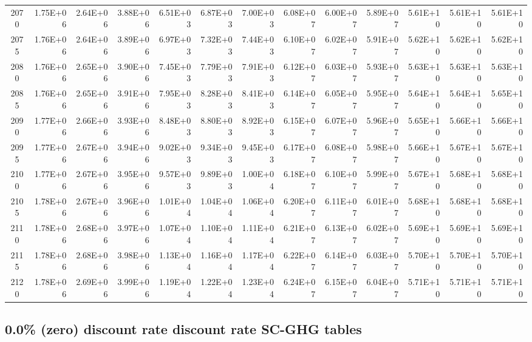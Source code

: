 \documentclass{article}
\begin{document}
\begin{table}
\begin{tabular}{crrr|rrr|rrr|rrr}
2070     & 1.75E+06   & 2.64E+06   & 3.88E+06   & 6.51E+03   & 6.87E+03   & 7.00E+03   & 6.08E+07   & 6.00E+07   & 5.89E+07   & 5.61E+10   & 5.61E+10   & 5.61E+10   \\
2075     & 1.76E+06   & 2.64E+06   & 3.89E+06   & 6.97E+03   & 7.32E+03   & 7.44E+03   & 6.10E+07   & 6.02E+07   & 5.91E+07   & 5.62E+10   & 5.62E+10   & 5.62E+10   \\
2080     & 1.76E+06   & 2.65E+06   & 3.90E+06   & 7.45E+03   & 7.79E+03   & 7.91E+03   & 6.12E+07   & 6.03E+07   & 5.93E+07   & 5.63E+10   & 5.63E+10   & 5.63E+10   \\
2085     & 1.76E+06   & 2.65E+06   & 3.91E+06   & 7.95E+03   & 8.28E+03   & 8.41E+03   & 6.14E+07   & 6.05E+07   & 5.95E+07   & 5.64E+10   & 5.64E+10   & 5.65E+10   \\
2090     & 1.77E+06   & 2.66E+06   & 3.93E+06   & 8.48E+03   & 8.80E+03   & 8.92E+03   & 6.15E+07   & 6.07E+07   & 5.96E+07   & 5.65E+10   & 5.66E+10   & 5.66E+10   \\
2095     & 1.77E+06   & 2.67E+06   & 3.94E+06   & 9.02E+03   & 9.34E+03   & 9.45E+03   & 6.17E+07   & 6.08E+07   & 5.98E+07   & 5.66E+10   & 5.67E+10   & 5.67E+10   \\
2100     & 1.77E+06   & 2.67E+06   & 3.95E+06   & 9.57E+03   & 9.89E+03   & 1.00E+04   & 6.18E+07   & 6.10E+07   & 5.99E+07   & 5.67E+10   & 5.68E+10   & 5.68E+10   \\
2105     & 1.78E+06   & 2.67E+06   & 3.96E+06   & 1.01E+04   & 1.04E+04   & 1.06E+04   & 6.20E+07   & 6.11E+07   & 6.01E+07   & 5.68E+10   & 5.68E+10   & 5.68E+10   \\
2110     & 1.78E+06   & 2.68E+06   & 3.97E+06   & 1.07E+04   & 1.10E+04   & 1.11E+04   & 6.21E+07   & 6.13E+07   & 6.02E+07   & 5.69E+10   & 5.69E+10   & 5.69E+10   \\
2115     & 1.78E+06   & 2.68E+06   & 3.98E+06   & 1.13E+04   & 1.16E+04   & 1.17E+04   & 6.22E+07   & 6.14E+07   & 6.03E+07   & 5.70E+10   & 5.70E+10   & 5.70E+10   \\
2120     & 1.78E+06   & 2.69E+06   & 3.99E+06   & 1.19E+04   & 1.22E+04   & 1.23E+04   & 6.24E+07   & 6.15E+07   & 6.04E+07   & 5.71E+10   & 5.71E+10   & 5.71E+10  

\end{tabular}   \end{table}
\clearpage

\subsection{0.0\% (zero) discount rate discount rate SC-GHG tables}
\end{document}
